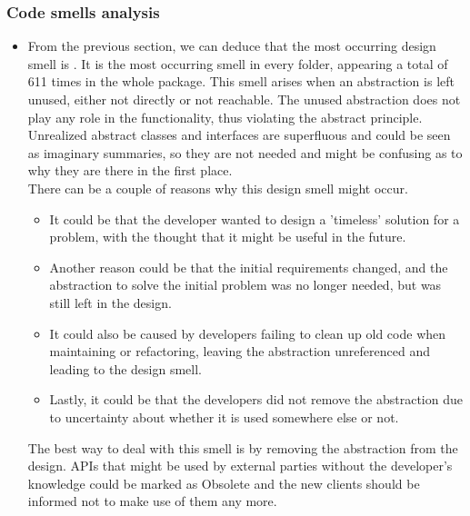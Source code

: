         \subsubsection{Code smells analysis}
        \begin{itemize}
            \item From the previous section, we can deduce that the most occurring design smell is . It is the most occurring smell in every folder, appearing a total of 611 times in the whole  package. This smell arises when an abstraction is left unused, either not directly or not reachable. The unused abstraction does not play any role in the functionality, thus violating the abstract principle. Unrealized abstract classes and interfaces are superfluous and could be seen as imaginary summaries, so they are not needed and might be confusing as to why they are there in the first place. \\
            There can be a couple of reasons why this design smell might occur.
            \begin{itemize}
                \item It could be that the developer wanted to design a 'timeless' solution for a  problem, with the thought that it might be useful in the future. 
                \item Another reason could be that the initial requirements changed, and the abstraction to solve the initial problem was no longer needed, but was still left in the design.
                \item It could also be caused by developers failing to clean up old code when maintaining or refactoring, leaving the abstraction unreferenced and leading to the design smell.
                \item Lastly, it could be that the developers did not remove the abstraction due to uncertainty about whether it is used somewhere else or not.
            \end{itemize}
            The best way to deal with this smell is by removing the abstraction from the design. APIs that might be used by external parties without the developer's knowledge could be marked as Obsolete and the new clients should be informed not to make use of them any more.
            

\end{itemize}

